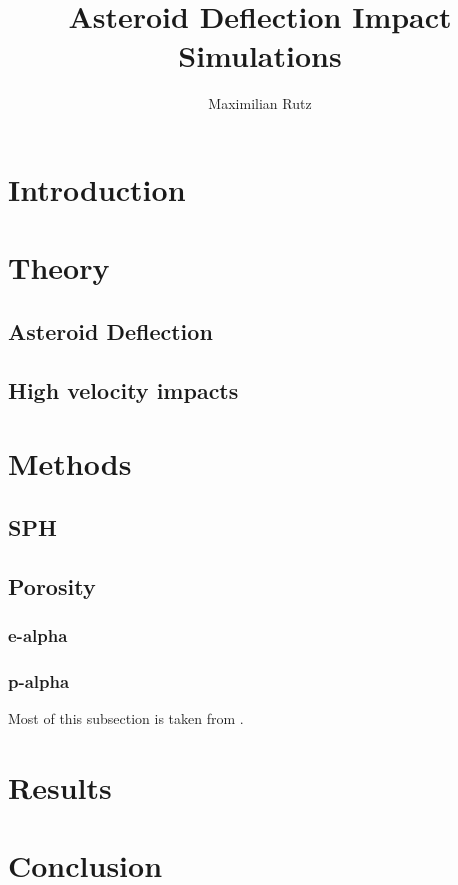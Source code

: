 \documentclass{article}
\title{Asteroid Deflection Impact Simulations}
\author{Maximilian Rutz}
\date{}
\begin{document}
	\maketitle
	\begin{abstract}
	 
	\end{abstract}
	
	\newpage
	\tableofcontents
	 
	\newpage
	\section{Introduction} 
	\section{Theory}
		\subsection{Asteroid Deflection}
		\subsection{High velocity impacts}
	\section{Methods}
		\subsection{SPH}
		\subsection{Porosity}
		\subsubsection{e-alpha}
		\subsubsection{p-alpha}
		Most of this subsection is taken from \cite{Jutzi_p_alpha_1}.		 
	\section{Results}
	\section{Conclusion}
	
	\newpage 
	\printbibliography
 
\end{document}

